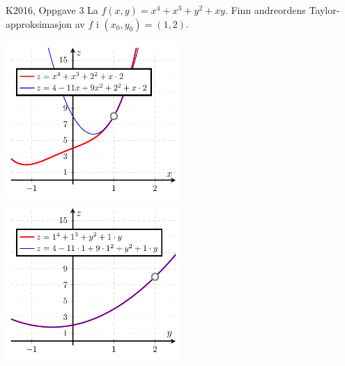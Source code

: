 \begin{frame}
  \begin{oppgave}{K2016, Oppgave 3}
    La $f(x,y) = x^4 + x^3 + y^2 + xy$. Finn andreordens Taylor-approksimasjon
    av $f$ i $(x_0, y_0) = (1,2)$.
  \end{oppgave}
  \includegraphics[width=0.5\textwidth]{../img/taylor-zx}%
  \includegraphics[width=0.5\textwidth]{../img/taylor-zy}
\end{frame}

